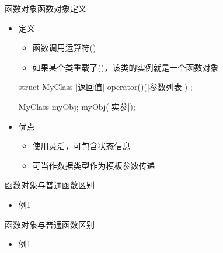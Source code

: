 \begin{frame}[t, fragile]{函数对象}{函数对象定义}%
  \begin{itemize}
  \item 定义
    \begin{itemize}
    \item 函数调用运算符()
    \item 如果某个类重载了()，该类的实例就是一个函数对象
    \end{itemize}
    \begin{center}
      \begin{minipage}[t]{0.65\linewidth}
        \begin{cppttnobg}
struct MyClass
{
  |返回值| operator()(|参数列表|) {}
};

MyClass myObj;
myObj(|实参|);
        \end{cppttnobg}
      \end{minipage}
    \end{center}
  \item 优点
    \begin{itemize}
    \item 使用灵活，可包含状态信息
    \item 可当作数据类型作为模板参数传递
    \end{itemize}
  \end{itemize}
\end{frame}

\begin{frame}[t, fragile]{函数对象}{与普通函数区别}
  \begin{itemize}
  \item 例1
  \end{itemize}
  \begin{center}
  \end{center}
\end{frame}

\begin{frame}[t, fragile]{函数对象}{与普通函数区别}
  \begin{itemize}
  \item 例1
  \end{itemize}
  \begin{center}
  \end{center}
\end{frame}

